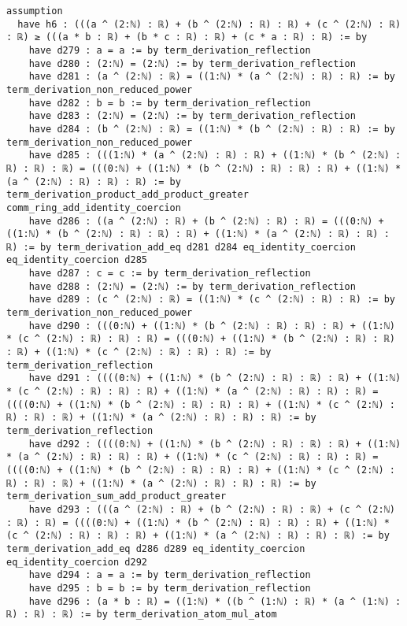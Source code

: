 \documentclass{article}
\begin{document}
\begin{tcolorbox}[colback=white!10, width=\linewidth]
\begin{lstlisting}[language=Lean4]
    assumption
  have h6 : (((a ^ (2:ℕ) : ℝ) + (b ^ (2:ℕ) : ℝ) : ℝ) + (c ^ (2:ℕ) : ℝ) : ℝ) ≥ (((a * b : ℝ) + (b * c : ℝ) : ℝ) + (c * a : ℝ) : ℝ) := by
    have d279 : a = a := by term_derivation_reflection
    have d280 : (2:ℕ) = (2:ℕ) := by term_derivation_reflection
    have d281 : (a ^ (2:ℕ) : ℝ) = ((1:ℕ) * (a ^ (2:ℕ) : ℝ) : ℝ) := by term_derivation_non_reduced_power
    have d282 : b = b := by term_derivation_reflection
    have d283 : (2:ℕ) = (2:ℕ) := by term_derivation_reflection
    have d284 : (b ^ (2:ℕ) : ℝ) = ((1:ℕ) * (b ^ (2:ℕ) : ℝ) : ℝ) := by term_derivation_non_reduced_power
    have d285 : (((1:ℕ) * (a ^ (2:ℕ) : ℝ) : ℝ) + ((1:ℕ) * (b ^ (2:ℕ) : ℝ) : ℝ) : ℝ) = (((0:ℕ) + ((1:ℕ) * (b ^ (2:ℕ) : ℝ) : ℝ) : ℝ) + ((1:ℕ) * (a ^ (2:ℕ) : ℝ) : ℝ) : ℝ) := by term_derivation_product_add_product_greater comm_ring_add_identity_coercion
    have d286 : ((a ^ (2:ℕ) : ℝ) + (b ^ (2:ℕ) : ℝ) : ℝ) = (((0:ℕ) + ((1:ℕ) * (b ^ (2:ℕ) : ℝ) : ℝ) : ℝ) + ((1:ℕ) * (a ^ (2:ℕ) : ℝ) : ℝ) : ℝ) := by term_derivation_add_eq d281 d284 eq_identity_coercion eq_identity_coercion d285
    have d287 : c = c := by term_derivation_reflection
    have d288 : (2:ℕ) = (2:ℕ) := by term_derivation_reflection
    have d289 : (c ^ (2:ℕ) : ℝ) = ((1:ℕ) * (c ^ (2:ℕ) : ℝ) : ℝ) := by term_derivation_non_reduced_power
    have d290 : (((0:ℕ) + ((1:ℕ) * (b ^ (2:ℕ) : ℝ) : ℝ) : ℝ) + ((1:ℕ) * (c ^ (2:ℕ) : ℝ) : ℝ) : ℝ) = (((0:ℕ) + ((1:ℕ) * (b ^ (2:ℕ) : ℝ) : ℝ) : ℝ) + ((1:ℕ) * (c ^ (2:ℕ) : ℝ) : ℝ) : ℝ) := by term_derivation_reflection
    have d291 : ((((0:ℕ) + ((1:ℕ) * (b ^ (2:ℕ) : ℝ) : ℝ) : ℝ) + ((1:ℕ) * (c ^ (2:ℕ) : ℝ) : ℝ) : ℝ) + ((1:ℕ) * (a ^ (2:ℕ) : ℝ) : ℝ) : ℝ) = ((((0:ℕ) + ((1:ℕ) * (b ^ (2:ℕ) : ℝ) : ℝ) : ℝ) + ((1:ℕ) * (c ^ (2:ℕ) : ℝ) : ℝ) : ℝ) + ((1:ℕ) * (a ^ (2:ℕ) : ℝ) : ℝ) : ℝ) := by term_derivation_reflection
    have d292 : ((((0:ℕ) + ((1:ℕ) * (b ^ (2:ℕ) : ℝ) : ℝ) : ℝ) + ((1:ℕ) * (a ^ (2:ℕ) : ℝ) : ℝ) : ℝ) + ((1:ℕ) * (c ^ (2:ℕ) : ℝ) : ℝ) : ℝ) = ((((0:ℕ) + ((1:ℕ) * (b ^ (2:ℕ) : ℝ) : ℝ) : ℝ) + ((1:ℕ) * (c ^ (2:ℕ) : ℝ) : ℝ) : ℝ) + ((1:ℕ) * (a ^ (2:ℕ) : ℝ) : ℝ) : ℝ) := by term_derivation_sum_add_product_greater
    have d293 : (((a ^ (2:ℕ) : ℝ) + (b ^ (2:ℕ) : ℝ) : ℝ) + (c ^ (2:ℕ) : ℝ) : ℝ) = ((((0:ℕ) + ((1:ℕ) * (b ^ (2:ℕ) : ℝ) : ℝ) : ℝ) + ((1:ℕ) * (c ^ (2:ℕ) : ℝ) : ℝ) : ℝ) + ((1:ℕ) * (a ^ (2:ℕ) : ℝ) : ℝ) : ℝ) := by term_derivation_add_eq d286 d289 eq_identity_coercion eq_identity_coercion d292
    have d294 : a = a := by term_derivation_reflection
    have d295 : b = b := by term_derivation_reflection
    have d296 : (a * b : ℝ) = ((1:ℕ) * ((b ^ (1:ℕ) : ℝ) * (a ^ (1:ℕ) : ℝ) : ℝ) : ℝ) := by term_derivation_atom_mul_atom

\end{lstlisting}
\end{tcolorbox}
\end{document}

